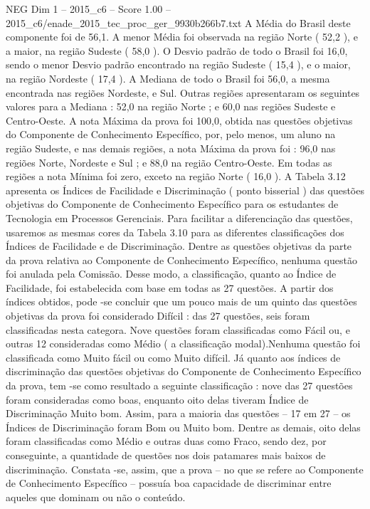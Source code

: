 \begin{textsample}{NEG Dim 1 – 2015\_c6 – Score 1.00 – 2015\_c6/enade\_2015\_tec\_proc\_ger\_9930b266b7.txt}
A Média do Brasil deste componente foi de 56,1.
A menor Média foi observada na região Norte ( 52,2 ), e a maior, na região Sudeste ( 58,0 ).
O Desvio padrão de todo o Brasil foi 16,0, sendo o menor Desvio padrão encontrado na região Sudeste ( 15,4 ), e o maior, na região Nordeste ( 17,4 ).
A Mediana de todo o Brasil foi 56,0, a mesma encontrada nas regiões Nordeste, e Sul.
Outras regiões apresentaram os seguintes valores para a Mediana : 52,0 na região Norte ; e 60,0 nas regiões Sudeste e Centro-Oeste.
A nota Máxima da prova foi 100,0, obtida nas questões objetivas do Componente de Conhecimento Específico, por, pelo menos, um aluno na região Sudeste, e nas demais regiões, a nota Máxima da prova foi : 96,0 nas regiões Norte, Nordeste e Sul ; e 88,0 na região Centro-Oeste.
Em todas as regiões a nota Mínima foi zero, exceto na região Norte ( 16,0 ).
A Tabela 3.12 apresenta os Índices de Facilidade e Discriminação ( ponto bisserial ) das questões objetivas do Componente de Conhecimento Específico para os estudantes de Tecnologia em Processos Gerenciais.
Para facilitar a diferenciação das questões, usaremos as mesmas cores da Tabela 3.10 para as diferentes classificações dos Índices de Facilidade e de Discriminação.
Dentre as questões objetivas da parte da prova relativa ao Componente de Conhecimento Específico, nenhuma questão foi anulada pela Comissão.
Desse modo, a classificação, quanto ao Índice de Facilidade, foi estabelecida com base em todas as 27 questões.
A partir dos índices obtidos, pode -se concluir que um pouco mais de um quinto das questões objetivas da prova foi considerado Difícil : das 27 questões, seis foram classificadas nesta categora.
Nove questões foram classificadas como Fácil ou, e outras 12 consideradas como Médio ( a classificação modal).Nenhuma questão foi classificada como Muito fácil ou como Muito difícil.
Já quanto aos índices de discriminação das questões objetivas do Componente de Conhecimento Específico da prova, tem -se como resultado a seguinte classificação : nove das 27 questões foram consideradas como boas, enquanto oito delas tiveram Índice de Discriminação Muito bom.
Assim, para a maioria das questões – 17 em 27 – os Índices de Discriminação foram Bom ou Muito bom.
Dentre as demais, oito delas foram classificadas como Médio e outras duas como Fraco, sendo dez, por conseguinte, a quantidade de questões nos dois patamares mais baixos de discriminação.
Constata -se, assim, que a prova – no que se refere ao Componente de Conhecimento Específico – possuía boa capacidade de discriminar entre aqueles que dominam ou não o conteúdo.

\end{textsample}
